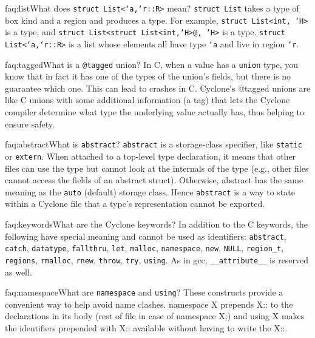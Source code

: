 \begin{faqa}{faq:list}{What does \texttt{struct List<`a,`r::R>} mean?}
\texttt{struct List} takes a type of box kind and a region and
produces a type.  For example, \texttt{struct List<int, `H>} is a
type, and \texttt{struct List<struct List<int,`H>@, `H>} is a type.
\texttt{struct List<`a,`r::R>} is a list whose elements all have type
\texttt{`a} and live in region \texttt{`r}.
\end{faqa}

\begin{faqa}{faq:tagged}{What is a \texttt{@tagged} union?}
In C, when a value has a \texttt{union} type, you know that in fact it
has one of the types of the union's fields, but there is no guarantee
which one.  This can lead to crashes in C\@.  Cyclone's @tagged unions
are like C unions with some additional information (a tag) that lets
the Cyclone compiler determine what type the underlying value actually
has, thus helping to ensure safety.
\end{faqa}

\begin{faqa}{faq:abstract}{What is \texttt{abstract}?}
\texttt{abstract} is a storage-class specifier, like \texttt{static}
or \texttt{extern}.  When attached to a top-level type declaration, it
means that other files can use the type but cannot look at the
internals of the type (e.g., other files cannot access the fields of
an abstract struct).  Otherwise, abstract has the same meaning as the
\texttt{auto} (default) storage class.  Hence \texttt{abstract} is a
way to state within a Cyclone file that a type's representation cannot
be exported.
\end{faqa}

\begin{faqa}{faq:keywords}{What are the Cyclone keywords?}
In addition to the C keywords, the following have special meaning and
cannot be used as identifiers: \texttt{abstract}, \texttt{catch},
\texttt{datatype}, \texttt{fallthru}, \texttt{let}, \texttt{malloc},
\texttt{namespace}, \texttt{new}, \texttt{NULL}, \texttt{region_t},
\texttt{regions}, \texttt{rmalloc}, \texttt{rnew}, \texttt{throw},
\texttt{try}, \texttt{using}.  As in gcc, \texttt{__attribute__} is
reserved as well.
\end{faqa}

\begin{faqa}{faq:namespace}{What are \texttt{namespace} and \texttt{using}?}
These constructs provide a convenient way to help avoid name clashes.
namespace X prepends X:: to the declarations in its body (rest of file
in case of namespace X;) and using X makes the identifiers prepended
with X:: available without having to write the X::.
\end{faqa}

